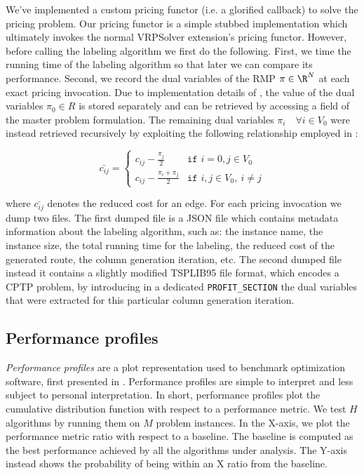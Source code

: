 \medskip

We've implemented a custom pricing functor (i.e. a glorified callback) to solve the pricing problem.
Our pricing functor is a simple stubbed implementation which ultimately invokes
the normal VRPSolver extension's pricing functor.
However, before calling the labeling algorithm we first do the following.
First, we time the running time of the labeling algorithm so that later
we can compare its performance.
Second, we record the dual variables of the RMP $\pi \in \R^N$ at each
exact pricing invocation.
Due to implementation details of \bapcod, the value of
the dual variables $\pi_0 \in R$ is stored separately
and can be retrieved by accessing a field of the master problem formulation.
The remaining dual variables $\pi_i \quad \forall i \in V_0$
were instead retrieved recursively by exploiting the following relationship
employed in \bapcod:

\begin{equation}
	\bar{c_{ij}} = \begin{cases}
		c_{ij} - \frac{\pi_{j}}{2}       & \texttt{if } i = 0, j \in V_0       \\
		c_{ij} - \frac{\pi_i + \pi_j}{2} & \texttt{if } i, j \in V_0,\ i \ne j
	\end{cases}
\end{equation}

where $\bar{c_{ij}}$ denotes the reduced cost for an edge.
For each pricing invocation we dump two files.
The first dumped file is a JSON file which contains metadata information about
the labeling algorithm, such as: the instance name, the instance size,
the total running time for the labeling, the reduced cost of the generated route,
the column generation iteration, etc.
The second dumped file instead it contains a slightly modified TSPLIB95 file format,
which encodes a CPTP problem, by introducing in a dedicated \texttt{PROFIT\_SECTION}
the dual variables that were extracted for this particular column generation iteration.

\subsection{Performance profiles}
\label{sec:results-performance-profiles}

\textit{Performance profiles} are a plot representation used to benchmark optimization software,
first presented in \textcite{dolan2002}.
Performance profiles are simple to interpret and less subject to personal interpretation.
In short, performance profiles plot the cumulative distribution function with respect to a performance metric.
We test $H$ algorithms by running them on $M$ problem instances.
In the X-axis, we plot the performance metric ratio with respect to a baseline.
The baseline is computed as the best performance achieved by all the algorithms under analysis.
The Y-axis instead shows the probability of being within an X ratio from the baseline.

